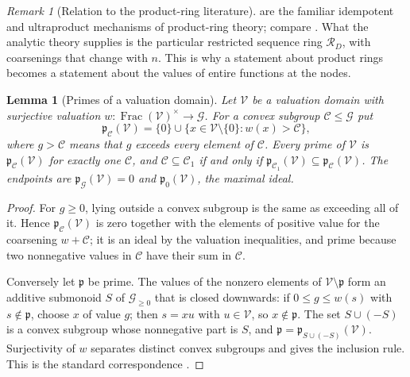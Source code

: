 \documentclass[11pt]{article}
\theoremstyle{plain}
\newtheorem{lemma}[lemma]{Lemma}
\theoremstyle{plain}
\theoremstyle{plain}
\theoremstyle{definition}
\theoremstyle{definition}
\theoremstyle{definition}
\theoremstyle{definition}
\theoremstyle{remark}
\newtheorem{remark}[remark]{Remark}
\newcommand{\RD}{\mathcal R_D}\newcommand{\Ucal}{\mathcal U}
\begin{document}
\begin{remark}[Relation to the product-ring literature]
\label{ent:ps:rem:ffw}
 are the familiar idempotent
and ultraproduct mechanisms of product-ring theory; compare \cite{FFW}. What
the analytic theory supplies is the particular restricted sequence ring
$\RD$, with coarsenings that change with $n$. This is why a statement about
product rings becomes a statement about the values of entire functions at
the nodes.
\end{remark}

\begin{lemma}[Primes of a valuation domain]
\label{ent:ps:lem:valuation-primes}
Let $\mathcal V$ be a valuation domain with surjective valuation
$w:\operatorname{Frac}(\mathcal V)^\times\to\mathcal G$. For a convex subgroup
$\mathcal C\le\mathcal G$ put
\[
 \mathfrak p_{\mathcal C}(\mathcal V)=\{0\}\cup
 \{x\in\mathcal V\setminus\{0\}:w(x)>\mathcal C\},
\]
where $g>\mathcal C$ means that $g$ exceeds every element of $\mathcal C$.
Every prime of $\mathcal V$ is $\mathfrak p_{\mathcal C}(\mathcal V)$ for
exactly one $\mathcal C$, and $\mathcal C\subseteq\mathcal C_1$ if and only
if $\mathfrak p_{\mathcal C_1}(\mathcal V)\subseteq\mathfrak p_{\mathcal
C}(\mathcal V)$. The endpoints are $\mathfrak p_{\mathcal G}(\mathcal V)=0$ and
$\mathfrak p_0(\mathcal V)$, the maximal ideal.
\end{lemma}
\begin{proof}
For $g\ge0$, lying outside a convex subgroup is the same as exceeding all of
it. Hence $\mathfrak p_{\mathcal C}(\mathcal V)$ is zero together with the
elements of positive value for the coarsening $w+\mathcal C$; it is an ideal
by the valuation inequalities, and prime because two nonnegative values in
$\mathcal C$ have their sum in $\mathcal C$.

Conversely let $\mathfrak p$ be prime. The values of the nonzero elements of
$\mathcal V\setminus\mathfrak p$ form an additive submonoid $S$ of
$\mathcal G_{\ge0}$ that is closed downwards: if $0\le g\le w(s)$ with
$s\notin\mathfrak p$, choose $x$ of value $g$; then $s=xu$ with
$u\in\mathcal V$, so $x\notin\mathfrak p$. The set $S\cup(-S)$ is a convex
subgroup whose nonnegative part is $S$, and $\mathfrak p=\mathfrak
p_{S\cup(-S)}(\mathcal V)$. Surjectivity of $w$ separates distinct convex
subgroups and gives the inclusion rule. This is the standard correspondence
\cite{StacksValuation}.
\end{proof}
\end{document}
